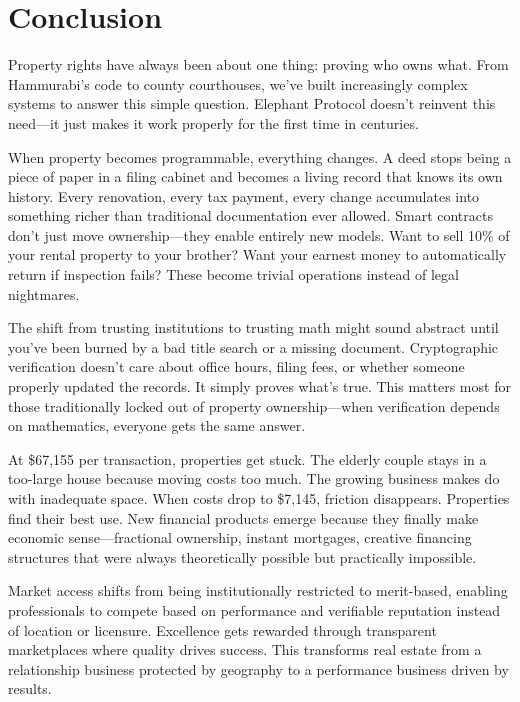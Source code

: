 \chapter{Conclusion}

Property rights have always been about one thing: proving who owns what. From Hammurabi's code to county courthouses, we've built increasingly complex systems to answer this simple question. Elephant Protocol doesn't reinvent this need---it just makes it work properly for the first time in centuries.

When property becomes programmable, everything changes. A deed stops being a piece of paper in a filing cabinet and becomes a living record that knows its own history. Every renovation, every tax payment, every change accumulates into something richer than traditional documentation ever allowed. Smart contracts don't just move ownership---they enable entirely new models. Want to sell 10\% of your rental property to your brother? Want your earnest money to automatically return if inspection fails? These become trivial operations instead of legal nightmares.

The shift from trusting institutions to trusting math might sound abstract until you've been burned by a bad title search or a missing document. Cryptographic verification doesn't care about office hours, filing fees, or whether someone properly updated the records. It simply proves what's true. This matters most for those traditionally locked out of property ownership---when verification depends on mathematics, everyone gets the same answer.

At \$67,155 per transaction, properties get stuck. The elderly couple stays in a too-large house because moving costs too much. The growing business makes do with inadequate space. When costs drop to \$7,145, friction disappears. Properties find their best use. New financial products emerge because they finally make economic sense---fractional ownership, instant mortgages, creative financing structures that were always theoretically possible but practically impossible.

Market access shifts from being institutionally restricted to merit-based, enabling professionals to compete based on performance and verifiable reputation instead of location or licensure. Excellence gets rewarded through transparent marketplaces where quality drives success. This transforms real estate from a relationship business protected by geography to a performance business driven by results.

